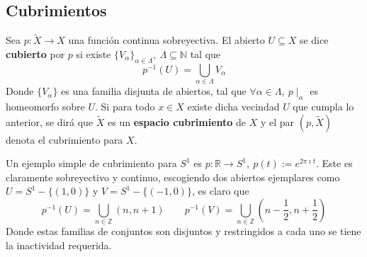 \subsection{Cubrimientos}
\begin{definicion}
Sea \(p : \tilde{X} \to X\) una función continua sobreyectiva. El
abierto \(U \subseteq X\) se dice \textbf{cubierto} por \(p\)
si existe \(\{V_\alpha\}_{\alpha \in \Lambda},\ \Lambda \subseteq
\mathbb N\) tal que
\[ p^{-1} (U) = \bigcup_{\alpha \in \Lambda} V_\alpha \]
Donde \(\{V_\alpha\}\) es una familia disjunta de abiertos, tal que
\(\forall \alpha \in \Lambda,\ p \mid_{\alpha}\) es homeomorfo sobre \(U\).
Si para todo \(x \in X\) existe dicha vecindad \(U\) que cumpla lo
anterior, se dirá que \(\tilde{X}\) es un \textbf{espacio cubrimiento}
de \(X\) y el par \((p,\tilde X)\) denota el cubrimiento para \(X\).
\end{definicion}

Un ejemplo simple de cubrimiento para \(S^1\) es \(p :
\mathbb R \to S^1,\ p(t) := e^{2 \pi \imath t}\). Este es claramente
sobreyectivo y continuo, escogiendo dos abiertos ejemplares como \(U =
S^1 - \{(1,0)\}\) y \(V = S^1 - \{(-1,0)\}\), es claro que
\[
    p^{-1} (U) = \bigcup_{n \in \mathbb Z} (n, n+1)
    \qquad p^{-1} (V) = \bigcup_{n \in \mathbb Z} (n - \frac 1 2, n + \frac 1
    2 )
\]
Donde estas familias de conjuntos son disjuntos y restringidos a cada
uno se tiene la inactividad requerida.

